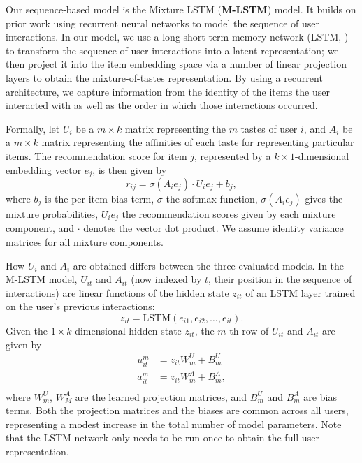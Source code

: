 \documentclass[sigconf]{acmart}
\begin{document}
Our sequence-based model is the Mixture LSTM (\textbf{M-LSTM}) model. It builds on prior work \citep{wu2017recurrent, hidasi2015session} using recurrent neural networks to model the sequence of user interactions. In our model, we use a long-short term memory network (LSTM, \cite{hochreiter1997long}) to transform the sequence of user interactions into a latent representation; we then project it into the item embedding space via a number of linear projection layers to obtain the mixture-of-tastes representation. By using a recurrent architecture, we capture information from the identity of the items the user interacted with as well as the order in which those interactions occurred.

Formally, let $U_i$ be a $m \times k$ matrix representing the $m$ tastes of user $i$, and $A_i$ be a $m \times k$ matrix representing the affinities of each taste for representing particular items. The recommendation score for item $j$, represented by a $k \times 1$-dimensional embedding vector $e_j$, is then given by
\begin{equation}
  r_{ij} = \sigma\left(A_ie_j\right) \cdot U_ie_j + b_j,
\end{equation}
where $b_j$ is the per-item bias term, $\sigma$ the softmax function, $\sigma\left(A_ie_j\right)$ gives the mixture probabilities, $U_ie_j$ the recommendation scores given by each mixture component, and $\cdot$ denotes the vector dot product. We assume identity variance matrices for all mixture components.

How $U_i$ and $A_i$ are obtained differs between the three evaluated models. In the M-LSTM model, $U_{it}$ and $A_{it}$ (now indexed by $t$, their position in the sequence of interactions) are linear functions of the hidden state $z_{it}$ of an LSTM layer trained on the user's previous interactions:
\begin{equation}
  \label{eq:lstm}
  z_{it} = \mathrm{LSTM}\left(e_{i1}, e_{i2}, \ldots, e_{it}\right).
\end{equation}
Given the $1 \times k$ dimensional hidden state $z_{it}$, the $m$-th row of $U_{it}$ and $A_{it}$ are given by
\begin{equation}
\begin{aligned}
  u^m_{it} &= z_{it}W^U_m + B^U_m\\
  a^m_{it} &= z_{it}W^A_m + B^A_m,\\
\end{aligned}
\end{equation}
where $W^U_m$, $W^A_M$ are the learned projection matrices, and $B^U_m$ and $B^A_m$ are bias terms. Both the projection matrices and the biases are common across all users, representing a modest increase in the total number of model parameters. Note that the LSTM network only needs to be run once to obtain the full user representation.
\end{document}
